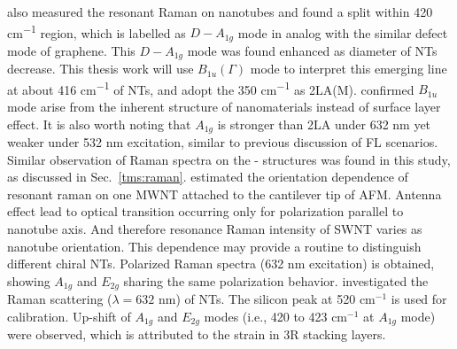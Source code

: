 \citeauthor{Krause2009} also measured the resonant Raman on  nanotubes and found a split within 420 \si{cm^{-1}} region, which is labelled as $D-A_{1g}$ mode in analog with the similar defect mode of graphene.\cite{Krause2009} This $D-A_{1g}$ mode was found enhanced as diameter of  NTs decrease. This thesis work will use $B_{1u}({\Gamma})$ mode to interpret this emerging line at about 416 \si{cm^{-1}} of  NTs, and adopt the 350 \si{cm^{-1}} as 2LA(M). \citeauthor{Krause2009a} confirmed $B_{1u}$ mode arise from the inherent structure of  nanomaterials instead of surface layer effect. It is also worth noting that $A_{1g}$ is stronger than 2LA under 632 nm yet weaker under 532 nm excitation, similar to previous discussion of FL scenarios.\cite{Krause2009a} Similar observation of Raman spectra on the - structures was found in this study, as discussed in Sec.~\ref{tms:raman}. \citeauthor{Rafailov2005} estimated the orientation dependence of resonant raman on one MWNT  attached to the cantilever tip of AFM.\cite{Rafailov2005} Antenna effect lead to optical transition occurring only for polarization parallel to nanotube axis. And therefore resonance Raman intensity of SWNT varies as nanotube orientation. This dependence may provide a routine to distinguish different chiral NTs. Polarized Raman spectra (632 nm excitation) is obtained, showing $A_{1g}$ and $E_{2g}$ sharing the same polarization behavior. \citeauthor{Virsek2007} investigated the Raman scattering ($\lambda=632$ nm) of  NTs.\cite{Virsek2007} The silicon peak at 520 cm$^{-1}$ is used for calibration. Up-shift of $A_{1g}$ and $E_{2g}$ modes (i.e., 420 to 423 cm$^{-1}$ at $A_{1g}$ mode) were observed, which is attributed to the strain in 3R stacking layers.
